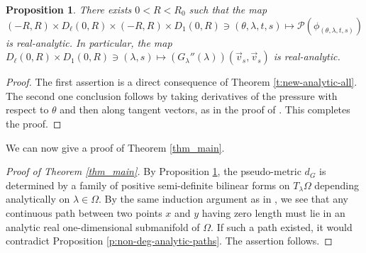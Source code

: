 \documentclass[11pt]{amsart}
\theoremstyle{plain}
\newtheorem{prop}[thm]{Proposition}
\theoremstyle{definition}
\theoremstyle{remark}
\begin{document}
\begin{prop} \label{prop_analyticity_form}
There exists $0<R<R_0$ such that the map 
$(-R,R)
\times D_\ell(0,R)\times
(-R,R)
\times D_1(0,R)\ni (\theta,\lambda,t,s) \mapsto \mathcal{P}(\phi_{(\theta,\lambda,t,s)})$ is real-analytic.
In particular, the map 
$D_\ell(0,R)\times
D_1 (0,R) \ni (\lambda,s)\mapsto (G_{\lambda}''(\lambda))
(\vec{v}_s, \vec{v}_s)$ 
is real-analytic.
\end{prop}

\begin{proof}
The first assertion is a 
direct 
consequence of Theorem \ref{t:new-analytic-all}. 
The second one conclusion follows by taking derivatives of the pressure with respect to $\theta$ and then
along tangent vectors, as in the proof of \cite[Corollary 5.2]{BH24}. This completes the proof.
\end{proof}

We can now give a proof of Theorem \ref{thm_main}.

\begin{proof}[Proof of Theorem \ref{thm_main}]
By Proposition \ref{prop_analyticity_form}, the pseudo-metric $d_G$ is determined by a family of positive semi-definite bilinear forms on $T_\lambda\Omega$ depending analytically on $\lambda \in \Omega$. By the same induction argument as in \cite[Section 5.4]{BH24}, we see that any continuous path between two points $x$ and $y$ having zero length must lie in an analytic real one-dimensional submanifold of $\Omega$. If such a path existed, it would contradict Proposition \ref{p:non-deg-analytic-paths}. The assertion follows.
\end{proof}

\printbibliography
\end{document}
